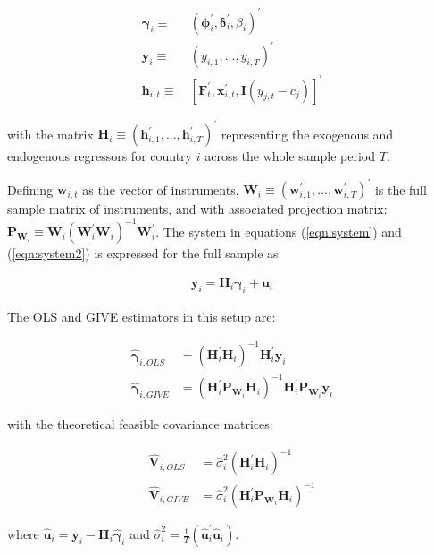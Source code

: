 \documentclass[../base.tex]{subfiles}
\begin{document}
\begin{align*}
 \boldsymbol{\gamma}_i \equiv&~ (\boldsymbol{\phi}_i^{\prime}, \boldsymbol{\delta}_{i}^{\prime}, \beta_i)^{\prime} \\
 \mathbf{y}_i \equiv&~ (y_{i,1},...,y_{i,T})^{\prime}\\
 \mathbf{h}_{i,t} \equiv&~ [\mathbf{F}_t^{\prime}, \mathbf{x}_{i,t}^{\prime}, \mathbf{I}(y_{j,t} - c_j)]^{\prime}
\end{align*}

with the matrix $\mathbf{H}_i \equiv (\mathbf{h}_{i,1}^{\prime},..., \mathbf{h}_{i,T}^{\prime})^{\prime}$ representing the exogenous and endogenous regressors for country $i$ across the whole sample period $T$. 

Defining $\mathbf{w}_{i,t}$ as the vector of instruments, $\mathbf{W}_i \equiv (\mathbf{w}_{i,1}^{\prime},..., \mathbf{w}_{i,T}^{\prime})^{\prime}$ is the full sample matrix of instruments, and with associated projection matrix: $\mathbf{P}_{\mathbf{W}_i} \equiv \mathbf{W}_i (\mathbf{W}_i^{\prime} \mathbf{W}_i)^{-1} \mathbf{W}_i^{\prime}$. The system in equations (\ref{eqn:system}) and (\ref{eqn:system2}) is expressed for the full sample as

\begin{align}
	\mathbf{y}_i = \mathbf{H}_i \boldsymbol{\gamma}_i + \mathbf{u}_i \label{eqn:matrix_system}
\end{align}

The OLS and GIVE estimators in this setup are:

\begin{align}
	\hat{\boldsymbol{\gamma}}_{i, OLS} &= (\mathbf{H}_i^{\prime} \mathbf{H}_i)^{-1} \mathbf{H}_i^{\prime} \mathbf{y}_i	\label{eqn:ols}\\	
	\hat{\boldsymbol{\gamma}}_{i, GIVE} &= (\mathbf{H}_i^{\prime} \mathbf{P}_{\mathbf{W}_i} \mathbf{H}_i)^{-1} \mathbf{H}_i^{\prime} \mathbf{P}_{\mathbf{W}_i} \mathbf{y}_i \label{eqn:give}	
\end{align}

with the theoretical feasible covariance matrices:

\begin{align*}
	\hat{\mathbf{V}}_{i, OLS} &= \hat{\sigma}^2_i (\mathbf{H}_i^{\prime} \mathbf{H}_i)^{-1} \\
	\hat{\mathbf{V}}_{i, GIVE} &= \hat{\sigma}^2_i (\mathbf{H}_i^{\prime} \mathbf{P}_{\mathbf{W}_i} \mathbf{H}_i)^{-1}
\end{align*}


where $\hat{\mathbf{u}}_i = \mathbf{y}_i - \mathbf{H}_i \hat{\boldsymbol{\gamma}}_i$ and $\hat{\sigma}^2_i = \frac{1}{T} (\hat{\mathbf{u}}_i^{\prime} \hat{\mathbf{u}}_i)$. 
\end{document}
